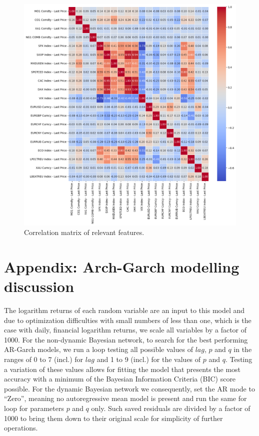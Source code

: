\documentclass[12pt, letterpaper]{article}
\begin{document}
\begin{figure}[H]
\centering
\includegraphics[width=1\textwidth]{graphics/corrtable2.png}
\caption{Correlation matrix of relevant features.}
\label{fig:correlationplot}
\end{figure}

\section{Appendix: Arch-Garch modelling discussion}
\label{appendix:archgarch}

The logarithm returns of each random variable are an input to this model and due to optimization difficulties with small numbers of less than one, which is the case with daily, financial logarithm returns, we scale all variables by a factor of 1000. For the non-dynamic Bayesian network, to search for the best performing AR-Garch models, we run a loop testing all possible values of $lag$, $p$ and $q$ in the ranges of 0 to 7 (incl.) for $lag$ and 1 to 9 (incl.) for the values of $p$ and $q$. Testing a variation of these values allows for fitting the model that presents the most accuracy with a minimum of the Bayesian Information Criteria (BIC) score possible. For the dynamic Bayesian network we consequently, set the AR mode to “Zero”, meaning no autoregressive mean model is present and run the same for loop for parameters $p$ and $q$ only. Such saved residuals are divided by a factor of 1000 to bring them down to their original scale for simplicity of further operations.
\end{document}
